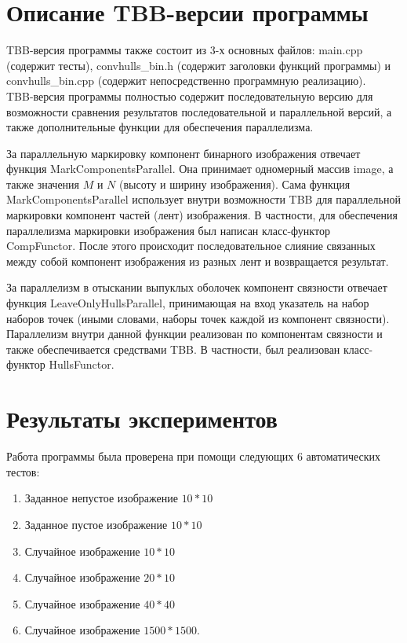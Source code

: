 \documentclass[14pt, russian]{extarticle}
\begin{document}
	\section{Описание TBB-версии программы}
	
	TBB-версия программы также состоит из 3-х основных файлов: main.cpp (содержит тесты), convhulls\_bin.h (содержит заголовки функций программы) и convhulls\_bin.cpp (содержит непосредственно программную реализацию).\\ \indent TBB-версия программы полностью содержит последовательную версию для возможности сравнения результатов последовательной и параллельной версий, а также дополнительные функции для обеспечения параллелизма.
	
	За параллельную маркировку компонент бинарного изображения отвечает функция MarkComponentsParallel. Она принимает одномерный массив image, а также значения $ M $ и $ N $ (высоту и ширину изображения). Сама функция MarkComponentsParallel использует внутри возможности TBB для параллельной маркировки компонент частей (лент) изображения. В частности, для обеспечения параллелизма маркировки изображения был написан класс-функтор CompFunctor. После этого происходит последовательное слияние связанных между собой компонент изображения из разных лент и возвращается результат.
	
	За параллелизм в отыскании выпуклых оболочек компонент связности отвечает функция LeaveOnlyHullsParallel, принимающая на вход указатель на набор наборов точек (иными словами, наборы точек каждой из компонент связности). Параллелизм внутри данной функции реализован по компонентам связности и также обеспечивается средствами TBB. В частности, был реализован класс-функтор HullsFunctor.
	\newpage
	
	\section{Результаты экспериментов}
	Работа программы была проверена при помощи следующих 6 автоматических тестов:
	\begin{enumerate}[topsep=0pt, labelwidth=!, labelindent=0pt]
		\item Заданное непустое изображение $10 * 10$
		\item Заданное пустое изображение $10 * 10$
		\item Случайное изображение $ 10 * 10 $
		\item Случайное изображение $ 20 * 10 $
		\item Случайное изображение $ 40 * 40 $
		\item Случайное изображение $ 1500 * 1500 $.
	\end{enumerate}
	
\end{document}
